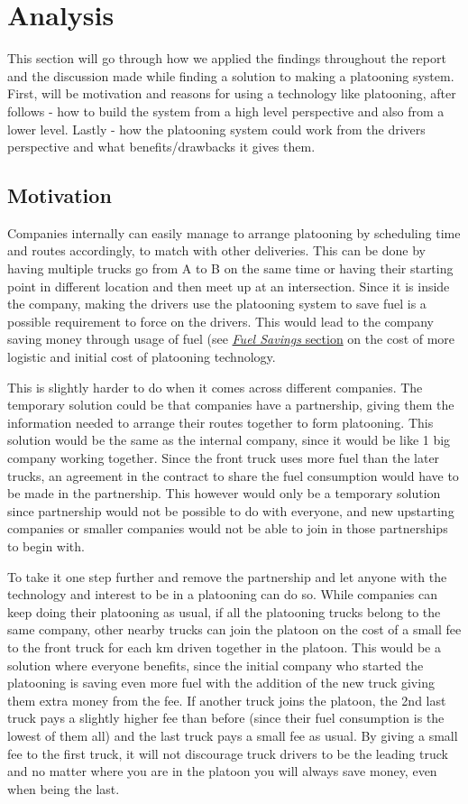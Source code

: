 \section{Analysis}\label{sec:analysis}
% 
This section will go through how we applied the findings throughout the report and the discussion made while finding a solution to making a platooning system. First, will be motivation and reasons for using a technology like platooning, after follows - how to build the system from a high level perspective and also from a lower level. Lastly - how the platooning system could work from the drivers perspective and what benefits/drawbacks it gives them.  
% 
\subsection{Motivation}
Companies internally can easily manage to arrange platooning by scheduling time and routes accordingly, to match with other deliveries. This can be done by having multiple trucks go from A to B on the same time or having their starting point in different location and then meet up at an intersection. Since it is inside the company, making the drivers use the platooning system to save fuel is a possible requirement to force on the drivers. This would lead to the company saving money through usage of fuel (see \hyperref[sec:fuel-saving]{\textit{Fuel Savings} section} on the cost of more logistic and initial cost of platooning technology.\par
% 
This is slightly harder to do when it comes across different companies. The temporary solution could be that companies have a partnership, giving them the information needed to arrange their routes together to form platooning. This solution would be the same as the internal company, since it would be like 1 big company working together. Since the front truck uses more fuel than the later trucks, an agreement in the contract to share the fuel consumption would have to be made in the partnership. This however would only be a temporary solution since partnership would not be possible to do with everyone, and new upstarting companies or smaller companies would not be able to join in those partnerships to begin with.\par
% 
To take it one step further and remove the partnership and let anyone with the technology and interest to be in a platooning can do so. While companies can keep doing their platooning as usual, if all the platooning trucks belong to the same company, other nearby trucks can join the platoon on the cost of a small fee to the front truck for each km driven together in the platoon. This would be a solution where everyone benefits, since the initial company who started the platooning is saving even more fuel with the addition of the new truck giving them extra money from the fee. If another truck joins the platoon, the 2nd last truck pays a slightly higher fee than before (since their fuel consumption is the lowest of them all) and the last truck pays a small fee as usual\footnotemark. By giving a small fee to the first truck, it will not discourage truck drivers to be the leading truck and no matter where you are in the platoon you will always save money, even when being the last.
